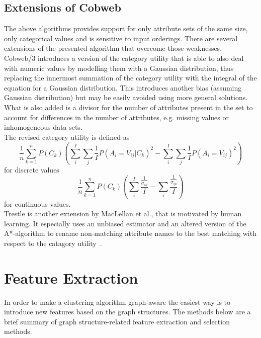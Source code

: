 \subsection{Extensions of Cobweb}\label{\positionnumber}
The above algorithms provides support for only attribute sets of the same size, only categorical values and is sensitive to input orderings. There are several extensions of the presented algorithm that overcome those weaknesses. \\

\noindent Cobweb/3 introduces a version of the category utility that is able to also deal with numeric values by modelling them with a Gaussian distribution, thus replacing the innermost summation of the category utility with the integral of the equation for a Gaussian distribution. This introduces another bias (assuming Gaussian distribution) but may be easily avoided using more general solutions. What is also added is a divisor for the number of attributes present in the set to account for differences in the number of attributes, e.g. missing values or inhomogeneous data sets. \\
The revised category utility is defined as   \[ \frac{1}{n} \sum_{k = 1}^n P(C_k) ( \sum_i^I \sum_j \frac{1}{I} P(A_i = V_{ij}| C_k)^2 - \sum_i^I \sum_j \frac{1}{I} P(A_i = V_{ij})^2) \] for discrete values 
\[ \frac{1}{n} \sum_{k = 1}^n P(C_k) ( \sum_i^I \frac{\frac{1}{\sigma_{ik}}}{I} - \sum_i \frac{\frac{1}{\sigma_{ip}}}{I}) \] 
for continuous values. \\

\noindent Trestle is another extension by MacLellan et al., that is motivated by human learning. It especially uses an unbiased estimator and an altered version of the A*-algorithm to rename non-matching attribute names to the best matching with respect to the catagory utility~\cite{maclellan2016trestle}.

\section{Feature Extraction}\label{\positionnumber}
In order to make a clustering algorithm graph-aware the easiest way is to introduce new features based on the graph structures. The methods below are a brief summary of graph structure-related feature extraction and selection methods. \\

